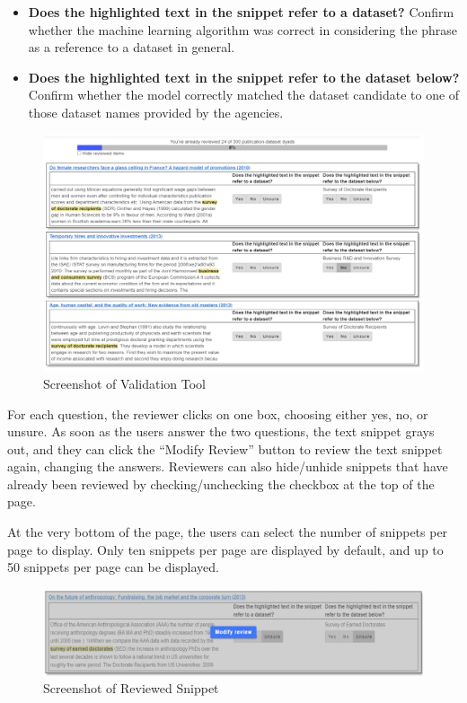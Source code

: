 \documentclass[titlepage, 11pt]{article}
\begin{document}
{\begin{description}
\begin{itemize}
    \item \textbf{Does the highlighted text in the snippet refer to a dataset?} Confirm whether the machine learning algorithm was correct in considering the phrase as a reference to a dataset in general.
    \item \textbf{Does the highlighted text in the snippet refer to the dataset below?} Confirm whether the model correctly matched the dataset candidate to one of those dataset names provided by the agencies.
\end{itemize}
\end{description}

\begin{figure}
  \includegraphics[scale=0.40]{validation_tool.png}
  \vspace{-2.5ex}
  \caption{Screenshot of Validation Tool}
  \label{fig:validation_tool}
\end{figure}

For each question, the reviewer clicks on one box, choosing either yes, no, or unsure. As soon as the users answer the two questions, the text snippet grays out, and they can click the “Modify Review” button to review the text snippet again, changing the answers. Reviewers can also hide/unhide snippets that have already been reviewed by checking/unchecking the checkbox at the top of the page. 

At the very bottom of the page, the users can select the number of snippets per page to display. Only ten snippets per page are displayed by default, and up to 50 snippets per page can be displayed.

\begin{figure}
  \includegraphics[scale=0.40]{review.png}
  \caption{Screenshot of Reviewed Snippet}
  \label{fig:review}
\end{figure}

}
\end{document}
